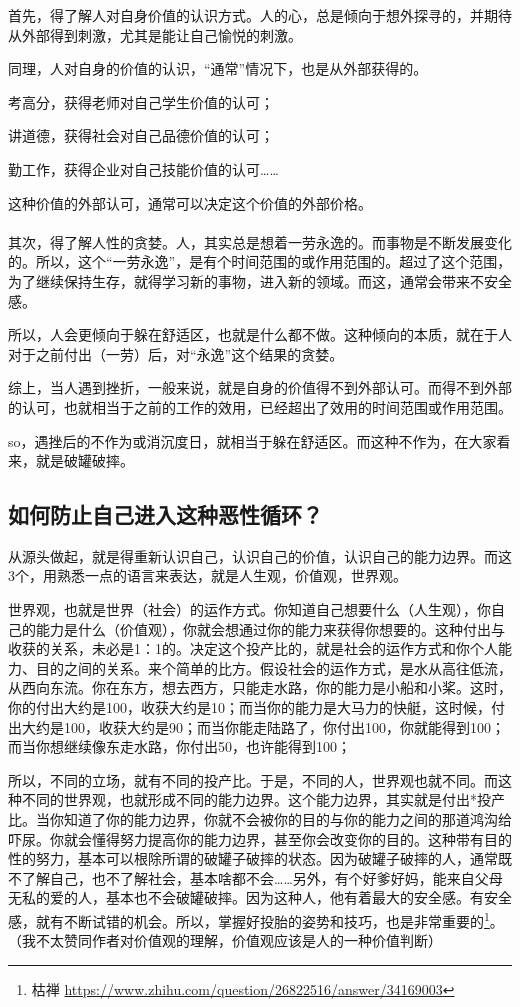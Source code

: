 首先，得了解人对自身价值的认识方式。人的心，总是倾向于想外探寻的，并期待从外部得到刺激，尤其是能让自己愉悦的刺激。

同理，人对自身的价值的认识，“通常”情况下，也是从外部获得的。

考高分，获得老师对自己学生价值的认可；

讲道德，获得社会对自己品德价值的认可；

勤工作，获得企业对自己技能价值的认可……

这种价值的外部认可，通常可以决定这个价值的外部价格。\\ \\

其次，得了解人性的贪婪。人，其实总是想着一劳永逸的。而事物是不断发展变化的。所以，这个“一劳永逸”，是有个时间范围的或作用范围的。超过了这个范围，为了继续保持生存，就得学习新的事物，进入新的领域。而这，通常会带来不安全感。

所以，人会更倾向于躲在舒适区，也就是什么都不做。这种倾向的本质，就在于人对于之前付出（一劳）后，对“永逸”这个结果的贪婪。

综上，当人遇到挫折，一般来说，就是自身的价值得不到外部认可。而得不到外部的认可，也就相当于之前的工作的效用，已经超出了效用的时间范围或作用范围。

so，遇挫后的不作为或消沉度日，就相当于躲在舒适区。而这种不作为，在大家看来，就是破罐破摔。

\subsection{如何防止自己进入这种恶性循环？}

从源头做起，就是得重新认识自己，认识自己的价值，认识自己的能力边界。而这3个，用熟悉一点的语言来表达，就是人生观，价值观，世界观。

世界观，也就是世界（社会）的运作方式。你知道自己想要什么（人生观），你自己的能力是什么（价值观），你就会想通过你的能力来获得你想要的。这种付出与收获的关系，未必是1：1的。决定这个投产比的，就是社会的运作方式和你个人能力、目的之间的关系。来个简单的比方。假设社会的运作方式，是水从高往低流，从西向东流。你在东方，想去西方，只能走水路，你的能力是小船和小桨。这时，你的付出大约是100，收获大约是10；而当你的能力是大马力的快艇，这时候，付出大约是100，收获大约是90；而当你能走陆路了，你付出100，你就能得到100；而当你想继续像东走水路，你付出50，也许能得到100；

所以，不同的立场，就有不同的投产比。于是，不同的人，世界观也就不同。而这种不同的世界观，也就形成不同的能力边界。这个能力边界，其实就是付出*投产比。当你知道了你的能力边界，你就不会被你的目的与你的能力之间的那道鸿沟给吓尿。你就会懂得努力提高你的能力边界，甚至你会改变你的目的。这种带有目的性的努力，基本可以根除所谓的破罐子破摔的状态。因为破罐子破摔的人，通常既不了解自己，也不了解社会，基本啥都不会……另外，有个好爹好妈，能来自父母无私的爱的人，基本也不会破罐破摔。因为这种人，他有着最大的安全感。有安全感，就有不断试错的机会。所以，掌握好投胎的姿势和技巧，也是非常重要的\footnote{枯禅 \quad \url{https://www.zhihu.com/question/26822516/answer/34169003}}。
（我不太赞同作者对价值观的理解，价值观应该是人的一种价值判断）

